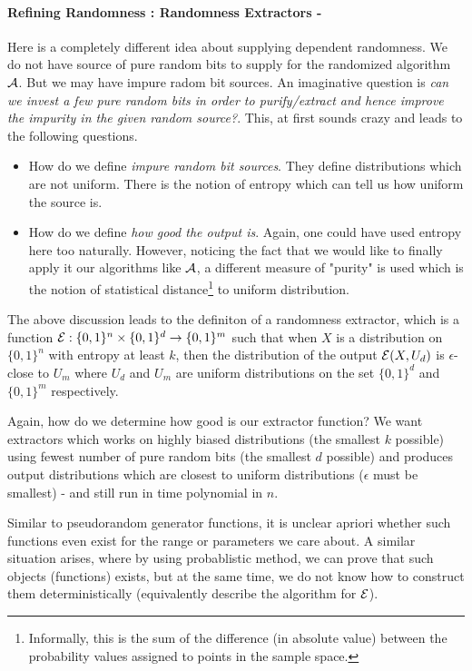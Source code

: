 \paragraph{Refining Randomness : Randomness Extractors -} Here is a completely different idea about supplying dependent randomness. We do not have source of pure random bits to supply for the randomized algorithm ${\cal{A}}$. But we may have impure radom bit sources. An imaginative question is {\em can we invest a few pure random bits in order to purify/extract and hence improve the impurity in the given random source?}. This, at first sounds crazy and leads to the following questions.
\begin{itemize}
\item How do we define {\em impure random bit sources}. They define distributions which are not uniform. There is the notion of entropy which can tell us how uniform the source is.
\item How do we define {\em how good the output is}. Again, one could have used entropy here too naturally. However, noticing the fact that we would like to finally apply it our algorithms like ${\cal{A}}$, a different measure of "purity" is used which is the notion of statistical distance\footnote{Informally, this is the sum of the difference (in absolute value) between the probability values assigned to points in the sample space.} to uniform distribution. 
\end{itemize}

The above discussion leads to the definiton of a randomness extractor, which is a function ${\cal{E}}: \{0,1\}^n \times \{0,1\}^d \to \{0,1\}^m$ such that when $X$ is a distribution on $\{0,1\}^n$ with entropy at least $k$, then the distribution of the output ${\cal{E}}(X,U_d)$ is $\epsilon$-close to $U_m$ where $U_d$ and $U_m$ are uniform distributions on the set $\{0,1\}^d$ and $\{0,1\}^m$ respectively.

Again, how do we determine how good is our extractor function? We want extractors which works on highly biased distributions (the smallest $k$ possible) using fewest number of pure random bits (the smallest $d$ possible) and produces output distributions which are closest to uniform distributions ($\epsilon$ must be smallest) - and still run in time polynomial in $n$.

Similar to pseudorandom generator functions, it is unclear apriori whether such functions even exist for the range or parameters we care about. A similar situation arises, where by using probablistic method, we can prove that such objects (functions) exists, but at the same time, we do not know how to construct them deterministically (equivalently describe the algorithm for ${\cal{E}}$).

